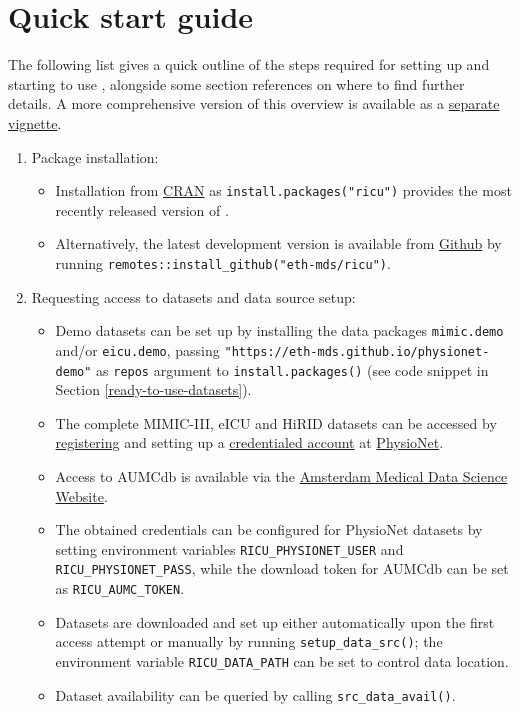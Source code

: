 \documentclass[
  notitle]{jss}
\begin{document}
\hypertarget{quick-start-guide}{%
\section{Quick start guide}\label{quick-start-guide}}

The following list gives a quick outline of the steps required for
setting up and starting to use , alongside some section
references on where to find further details. A more comprehensive
version of this overview is available as a
\href{https://CRAN.R-project.org/package=ricu/vignettes/ricu.html}{separate
vignette}.

\begin{enumerate}
\def\labelenumi{\arabic{enumi}.}
\item
  Package installation:

  \begin{itemize}
  \item
    Installation from \href{https://CRAN.R-project.org}{CRAN} as
    \texttt{install.packages("ricu")} provides the most recently
    released version of .
  \item
    Alternatively, the latest development version is available from
    \href{https://github.com/eth-mds/ricu}{Github} by running
    \texttt{remotes::install\_github("eth-mds/ricu")}.
  \end{itemize}
\item
  Requesting access to datasets and data source setup:

  \begin{itemize}
  \item
    Demo datasets can be set up by installing the data packages
    \texttt{mimic.demo} and/or \texttt{eicu.demo}, passing
    \texttt{"https://eth-mds.github.io/physionet-demo"} as
    \texttt{repos} argument to \texttt{install.packages()} (see code
    snippet in Section \ref{ready-to-use-datasets}).
  \item
    The complete MIMIC-III, eICU and HiRID datasets can be accessed by
    \href{https://physionet.org/register}{registering} and setting up a
    \href{https://physionet.org/settings/credentialing}{credentialed
    account} at \href{https://physionet.org}{PhysioNet}.
  \item
    Access to AUMCdb is available via the
    \href{https://amsterdammedicaldatascience.nl/\#amsterdamumcdb}{Amsterdam
    Medical Data Science Website}.
  \item
    The obtained credentials can be configured for PhysioNet datasets by
    setting environment variables \texttt{RICU\_PHYSIONET\_USER} and
    \texttt{RICU\_PHYSIONET\_PASS}, while the download token for AUMCdb
    can be set as \texttt{RICU\_AUMC\_TOKEN}.
  \item
    Datasets are downloaded and set up either automatically upon the
    first access attempt or manually by running
    \texttt{setup\_data\_src()}; the environment variable
    \texttt{RICU\_DATA\_PATH} can be set to control data location.
  \item
    Dataset availability can be queried by calling
    \texttt{src\_data\_avail()}.
  \end{itemize}


\end{enumerate}
\end{document}
